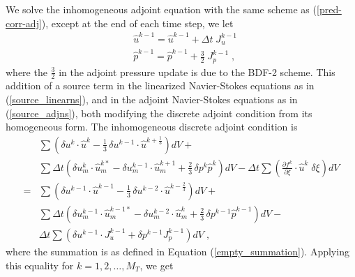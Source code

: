 We solve the inhomogeneous adjoint equation with the same scheme as
(\ref{pred-corr-adj}), except at the end of each time step, we let
\begin{equation} \begin{split} \label{source_adjns}
& {\hat u}^{k-1} = {\hat u}^{k-1} + \Delta t\; J_u^{k-1} \\
& {\hat p}^{k-1} = {\hat p}^{k-1} + \frac32\; J_p^{k-1} \;,
\end{split} \end{equation}
where the $\frac32$ in the adjoint pressure update is due to the BDF-2 scheme.
This addition of a source term in the linearized Navier-Stokes equations as
in (\ref{source_linearns}), and in the adjoint Navier-Stokes equations as in
(\ref{source_adjns}), both modifying the discrete adjoint condition from its
homogeneous form.  The inhomogeneous discrete adjoint condition is
\[\begin{split}
 & \sum \left( \delta u^k \cdot \hat u^k -
   \frac13\, \delta u^{k-1} \cdot \hat u^{k+\frac13} \right) dV + \\
 & \sum \Delta t \left( \delta u_m^k \cdot \hat u_m^{k*} -
                  \delta u_m^{k-1} \cdot \hat u_m^{k+1} +
                  \frac23\, \delta p^k \hat p^k \right) dV - 
 \Delta t \sum \left(\frac{\partial f^k}{\partial \xi} \cdot {\hat u}^k
                 \;\delta\xi\right) dV \\
=& \sum \left( \delta u^{k-1} \cdot \hat u^{k-1} -
   \frac13\, \delta u^{k-2} \cdot \hat u^{k-\frac23} \right) dV + \\
 & \sum \Delta t \left( \delta u_m^{k-1} \cdot \hat u_m^{k-1*} -
                   \delta u_m^{k-2} \cdot \hat u_m^k
                + \frac23\, \delta p^{k-1} \hat p^{k-1} \right) dV - \\
 & \Delta t \sum \left( \delta u^{k-1} \cdot J_u^{k-1}
                      + \delta p^{k-1} J_p^{k-1} \right) dV \;,
\end{split} \]
where the summation is as defined in Equation (\ref{empty_summation}).
Applying this equality for $k=1,2,\ldots,M_T$, we get

